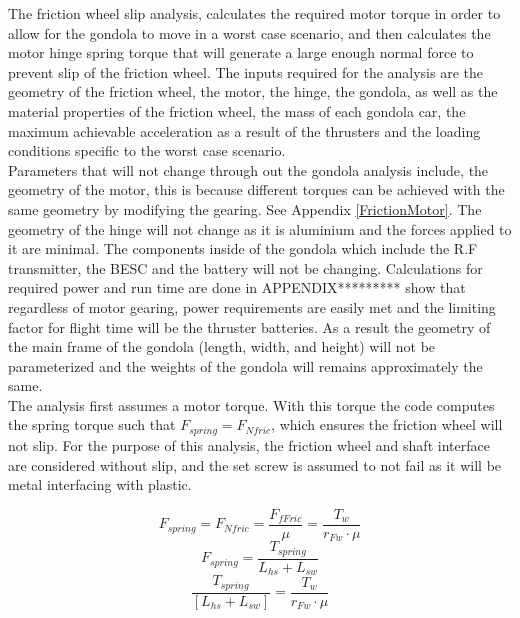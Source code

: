 \documentclass[../main.tex]{subfiles}
\begin{document}
The friction wheel slip analysis, calculates the required motor torque in order to allow for the gondola to move in a worst case scenario, and then calculates the motor hinge spring torque that will generate a large enough normal force to prevent slip of the friction wheel. The inputs required for the analysis are the geometry of the friction wheel, the motor, the hinge, the gondola, as well as the material properties of the friction wheel, the mass of each gondola car, the maximum achievable acceleration as a result of the thrusters and the loading conditions specific to the worst case scenario. \\

Parameters that will not change through out the gondola analysis include, the geometry of the motor, this is because different torques can be achieved with the same geometry by modifying the gearing. See Appendix \ref{FrictionMotor}. The geometry of the hinge will not change as it is aluminium and the forces applied to it are minimal. The components inside of the gondola which include the R.F transmitter, the BESC and the battery will not be changing. Calculations for required power and run time are done in APPENDIX********* show that regardless of motor gearing, power requirements are easily met and the limiting factor for flight time will be the thruster batteries. As a result the geometry of the main frame of the gondola (length, width, and height) will not be parameterized and the weights of the gondola will remains approximately the same. \\

The analysis first assumes a motor torque. With this torque the code computes the spring torque such that $F_{spring} = F_{Nfric}$, which ensures the friction wheel will not slip. For the purpose of this analysis, the friction wheel and shaft interface are considered without slip, and the set screw is assumed to not fail as it will be metal interfacing with plastic.

\begin{equation}
F_{spring} = F_{Nfric} = \frac{F_{fFric}}{\mu} = \frac{T_w}{r_{Fw}\cdot{}\mu}
\end{equation}
\begin{equation}
F_{spring} = \frac{T_{spring}}{L_{hs}+L_{sw}}
\end{equation}
\begin{equation}
\frac{T_{spring}}{[L_{hs}+L_{sw}]} = \frac{T_w}{r_{Fw}\cdot{}\mu}
\end{equation}
\end{document}
